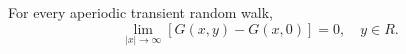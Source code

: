 For every aperiodic transient random walk,
\[
\lim_{|x| \to \infty} [G(x,y) - G(x,0)] = 0, \quad y \in R.
\]
